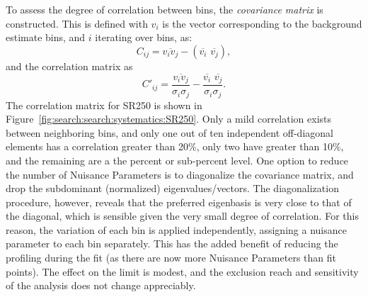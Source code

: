 To assess the degree of correlation between bins, the \textit{covariance matrix} is constructed. This is defined with $v_i$ is the vector corresponding to the background estimate bins, and $i$ iterating over bins, as:
%
\begin{equation}
C_{ij} = \overline{v_i v_j} - (\overline{v_i}\,\, \overline{v_j}),
\end{equation}
%
\noindent and the correlation matrix as
%
\begin{equation}
C'_{ij} = \frac{\overline{v_i v_j }}{\sigma_i \sigma_j} - \frac{\overline{v_i}\,\,\overline{v_j}}{\sigma_i \sigma_j}.
\end{equation}
%
\noindent The correlation matrix for SR250 is shown in Figure~\ref{fig:search:search:systematics:SR250}. Only a mild correlation exists between neighboring bins, and only one out of ten independent off-diagonal elements has a correlation greater than 20\%, only two have greater than 10\%, and the remaining are a the percent or sub-percent level. One option to reduce the number of Nuisance Parameters is to diagonalize the covariance matrix, and drop the subdominant (normalized) eigenvalues/vectors. The diagonalization procedure, however, reveals that the preferred eigenbasis is very close to that of the diagonal, which is sensible given the very small degree of correlation. For this reason, the variation of each bin is applied independently, assigning a nuisance parameter to each bin separately. This has the added benefit of reducing the profiling during the fit (as there are now more Nuisance Parameters than fit points). The effect on the limit is modest, and the exclusion reach and sensitivity of the analysis does not change appreciably.




